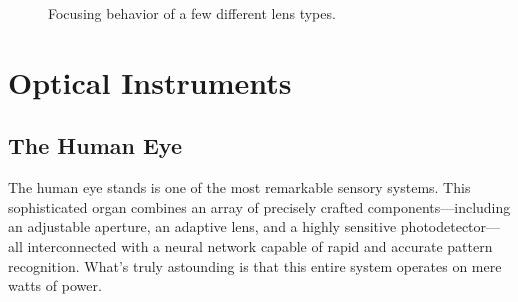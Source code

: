 \documentclass[
  a4paper,
]{book}
\begin{document}
\begin{figure}
\begin{minipage}{0.33\linewidth}


\end{minipage}%

\caption{\label{fig-lens-focusing}Focusing behavior of a few different
lens types.}

\end{figure}%

\chapter{Optical Instruments}\label{optical-instruments}

\section{The Human Eye}\label{the-human-eye}

The human eye stands is one of the most remarkable sensory systems. This
sophisticated organ combines an array of precisely crafted
components---including an adjustable aperture, an adaptive lens, and a
highly sensitive photodetector---all interconnected with a neural
network capable of rapid and accurate pattern recognition. What's truly
astounding is that this entire system operates on mere watts of power.
\end{document}
